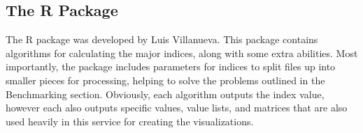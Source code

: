 \subsection{The  R Package}
The  R package was developed by Luis Villanueva. This package contains algorithms for calculating the major indices, along with some extra abilities. Most importantly, the  package includes parameters for indices to split files up into smaller pieces for processing, helping to solve the problems outlined in the Benchmarking section. Obviously, each algorithm outputs the index value, however each also outputs specific values, value lists, and matrices that are also used heavily in this service for creating the visualizations.







